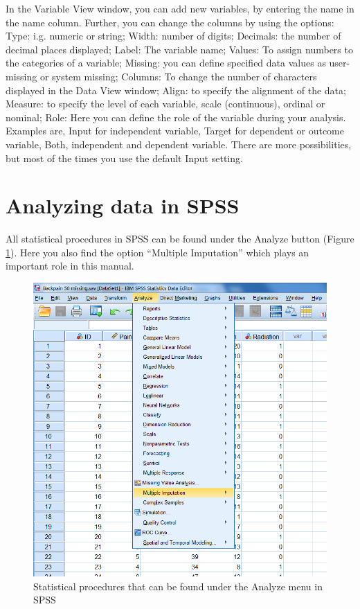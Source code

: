\documentclass[]{book}
\theoremstyle{definition}
\theoremstyle{definition}
\theoremstyle{definition}
\theoremstyle{remark}
\begin{document}
In the Variable View window, you can add new variables, by entering the
name in the name column. Further, you can change the columns by using
the options: Type: i.g. numeric or string; Width: number of digits;
Decimals: the number of decimal places displayed; Label: The variable
name; Values: To assign numbers to the categories of a variable;
Missing: you can define specified data values as user-missing or system
missing; Columns: To change the number of characters displayed in the
Data View window; Align: to specify the alignment of the data; Measure:
to specify the level of each variable, scale (continuous), ordinal or
nominal; Role: Here you can define the role of the variable during your
analysis. Examples are, Input for independent variable, Target for
dependent or outcome variable, Both, independent and dependent variable.
There are more possibilities, but most of the times you use the default
Input setting.

\section{Analyzing data in SPSS}\label{analyzing-data-in-spss}

All statistical procedures in SPSS can be found under the Analyze button
(Figure \ref{fig:fig4}). Here you also find the option ``Multiple
Imputation'' which plays an important role in this manual.

\begin{figure}

{\centering \includegraphics[width=0.9\linewidth]{images/fig1.4} 

}

\caption{Statistical procedures that can be found under the Analyze menu in SPSS}\label{fig:fig4}
\end{figure}
\end{document}

